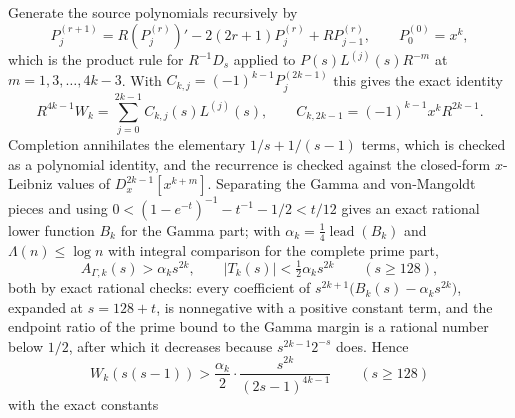 \documentclass[
  11pt,
]{book}
\begin{document}
Generate the source polynomials recursively by \[
P_j^{(r+1)}=R(P_j^{(r)})'-2(2r+1)P_j^{(r)}+RP_{j-1}^{(r)},
\qquad P_0^{(0)}=x^k,
\tag{74A.6}
\] which is the product rule for \(R^{-1}D_s\) applied to
\(P(s)L^{(j)}(s)R^{-m}\) at \(m=1,3,\ldots,4k-3\). With
\(C_{k,j}=(-1)^{k-1}P_j^{(2k-1)}\) this gives the exact identity \[
R^{4k-1}W_k=\sum_{j=0}^{2k-1}C_{k,j}(s)L^{(j)}(s),
\qquad
C_{k,2k-1}=(-1)^{k-1}x^kR^{2k-1}.
\tag{74A.7}
\] Completion annihilates the elementary \(1/s+1/(s-1)\) terms, which is
checked as a polynomial identity, and the recurrence is checked against
the closed-form \(x\)-Leibniz values of \(D_x^{2k-1}[x^{k+m}]\).
Separating the Gamma and von-Mangoldt pieces and using
\(0<(1-e^{-t})^{-1}-t^{-1}-1/2<t/12\) gives an exact rational lower
function \(B_k\) for the Gamma part; with
\(\alpha_k=\tfrac14\operatorname{lead}(B_k)\) and
\(\Lambda(n)\le\log n\) with integral comparison for the complete prime
part, \[
A_{\Gamma,k}(s)>\alpha_ks^{2k},
\qquad
|T_k(s)|<\tfrac12\alpha_ks^{2k}
\qquad(s\ge128),
\tag{74A.8}
\] both by exact rational checks: every coefficient of
\(s^{2k+1}\bigl(B_k(s)-\alpha_ks^{2k}\bigr)\), expanded at \(s=128+t\),
is nonnegative with a positive constant term, and the endpoint ratio of
the prime bound to the Gamma margin is a rational number below \(1/2\),
after which it decreases because \(s^{2k-1}2^{-s}\) does. Hence \[
\boxed{W_k(s(s-1))>\frac{\alpha_k}{2}\cdot\frac{s^{2k}}{(2s-1)^{4k-1}}
\qquad(s\ge128)}
\tag{74A.9}
\] with the exact constants
\end{document}

